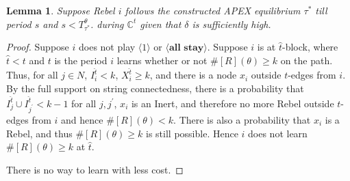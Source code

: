 \documentclass[12pt,letter]{article}
\newcommand{\Kappa}{\mathbb{C}}
\newtheorem{lemma}{Lemma}[section]
\theoremstyle{definition}
\theoremstyle{remark}
\theoremstyle{claim}
\begin{document}
\begin{lemma} Suppose Rebel $i$ follows the constructed APEX equilibrium $\tau^{*}$ till period $s$ and $s<T^{\theta}_{\tau^{*}}$. during $\Kappa^t$ given that $\delta$ is sufficiently high.
\end{lemma}
\begin{proof}



Suppose $i$ does not play $\langle 1 \rangle$ or $\langle \textbf{all stay} \rangle$. Suppose $i$ is at $\hat{t}$-block, where $\hat{t}<t$ and $t$ is the period $i$ learns whether or not $\#[R](\theta)\geq k$ on the path. Thus, for all $j\in N$, $I^{\hat{t}}_i<k$, $X^{\hat{t}}_i\geq k$, and there is a node $x_i$ outside $t$-edges from $i$. By the full support on string connectedness, there is a probability that $I^{\hat{t}}_j\cup I^{\hat{t}}_{j^{'}}<k-1$ for all $j,j^{'}$, $x_i$ is an Inert, and therefore no more Rebel outside $t$-edges from $i$ and hence $\#[R](\theta)<k$. There is also a probability that $x_i$ is a Rebel, and thus $\#[R](\theta)\geq k$ is still possible. Hence $i$ does not learn $\#[R](\theta)\geq k$ at $\hat{t}$.


There is no way to learn with less cost.


\end{proof}
\end{document}
